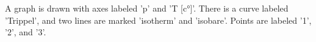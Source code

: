 A graph is drawn with axes labeled 'p' and 'T [c°]'. There is a curve labeled 'Trippel', and two lines are marked 'isotherm' and 'isobare'. Points are labeled '1', '2', and '3'.